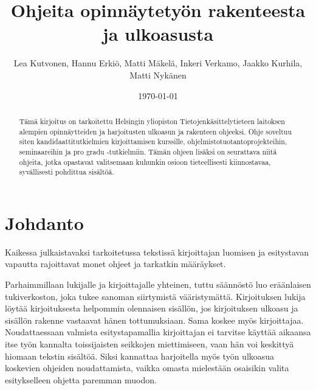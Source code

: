 \documentclass[finnish,gradu]{tktltiki}
\begin{document}
\singlespacing


\title{Ohjeita opinnäytetyön rakenteesta ja ulkoasusta}
\author{Lea Kutvonen, Hannu Erkiö, Matti Mäkelä, Inkeri Verkamo, Jaakko
Kurhila,  Matti Nykänen}
\date{\today}

\maketitle






\begin{abstract}

Tämä kirjoitus on tarkoitettu Helsingin yliopiston
Tietojenkäsittelytieteen laitoksen alempien opinnäytteiden ja
harjoitusten ulkoasun ja rakenteen ohjeeksi. Ohje soveltuu siten kandidaattitutkielmien
kirjoittamisen kurssille, ohjelmistotuotantoprojekteihin, seminaareihin ja pro gradu
-tutkielmiin. Tämän ohjeen lisäksi on seurattava niitä ohjeita, jotka opastavat valitsemaan kuhunkin osioon tieteellisesti kiinnostavaa, syvällisesti pohdittua sisältöä.

\end{abstract}

\mytableofcontents




\section{Johdanto}


Kaikessa julkaistavaksi tarkoitetussa tekstissä kirjoittajan luomisen ja
esitystavan vapautta rajoittavat monet ohjeet ja tarkatkin määräykset.

Parhaimmillaan lukijalle ja kirjoittajalle yhteinen, tuttu säännöstö luo
eräänlaisen tukiverkoston, joka tukee sanoman siirtymistä vääristymättä.
Kirjoituksen lukija löytää kirjoituksesta helpommin olennaisen sisällön,
jos kirjoituksen ulkoasu ja sisällön rakenne vastaavat hänen
tottumuksiaan. Sama koskee myös kirjoittajaa. Noudattaessaan valmista
esitystapamallia kirjoittajan ei tarvitse käyttää aikaansa itse työn
kannalta toissijaisten seikkojen miettimiseen, vaan hän voi keskittyä
hiomaan tekstin sisältöä. Siksi kannattaa harjoitella myös työn ulkoasua
koskevien ohjeiden noudattamista, vaikka omasta mielestään osaisikin
valita esitykselleen ohjetta paremman muodon.
\end{document}
